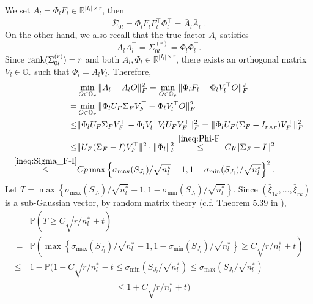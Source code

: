 \documentclass[11pt]{article}
\newcommand{\0}{{\mathbf{0}}}
\newcommand{\1}{{\mathbf{1}}}
\newcommand{\rank}{{\rm rank}}
\begin{document}
\begin{enumerate}[leftmargin=*]
	We set $\bar{A}_l = \Phi_l F_l \in \mathbb{R}^{|I_l|\times r}$, then
	$$\bar{\Sigma}_{0l} = \Phi_l F_lF_l^\top \Phi_l^\top =  \bar{A}_l\bar{A}_l^\top.$$
	On the other hand, we also recall that the true factor $A_l$ satisfies 
	\begin{equation}\label{eq:true-factor}
	A_lA_l^\top = \Sigma_{0l}^{(r)} = \Phi_l\Phi_l^\top.
	\end{equation}
	Since $\rank(\Sigma_{0l}^{(r)}) = r$ and both $A_l, \Phi_l\in \mathbb{R}^{|I_l|\times r}$, there exists an orthogonal matrix $V_l\in \mathbb{O}_r$ such that $\Phi_l = A_l V_l.$ Therefore,
	\begin{equation}\label{ineq:barA-A_l}
	\begin{split}
	& \min_{O\in \mathbb{O}_r} \|\bar{A}_l - A_lO\|_F^2 = \min_{O\in \mathbb{O}_r} \|\Phi_l F_l - \Phi_l V_l^\top O\|_F^2\\
	= & \min_{O\in \mathbb{O}_r} \|\Phi_l U_F\Sigma_F V_F^\top - \Phi_l V_l^\top O\|_F^2 \\
	\leq &  \|\Phi_l U_F\Sigma_FV_F^\top - \Phi_lV_l^\top V_lU_FV_F^\top \|_F ^2 = \|\Phi_lU_F(\Sigma_F - I_{r\times r})V_F^\top\|_F^2\\
	\leq & \|U_F(\Sigma_F - I)V_F^\top\|^2 \cdot \|\Phi_l\|_F^2 \overset{\eqref{ineq:Phi-F}}{\leq}  Cp\|\Sigma_F - I\|^2\\
	\overset{\eqref{ineq:Sigma_F-I}}{\leq} & Cp\max\left\{\sigma_{\max}(S_{J_l})/\sqrt{n_l^\ast} - 1, 1 - \sigma_{\min}(S_{J_l})/\sqrt{n_l^\ast}\right\}^2.
	\end{split}
	\end{equation}
	Let $T = \max\left\{\sigma_{\max}(S_{J_l})/\sqrt{n_l^\ast} - 1, 1 - \sigma_{\min}(S_{J_l})/\sqrt{n_l^\ast}\right\}$. Since $(\bar{\xi}_{1k}, \ldots, \bar{\xi}_{rk})$ is a sub-Gaussian vector, by random matrix theory (c.f. Theorem 5.39 in \cite{vershynin2010introduction}), 
	\begin{equation}\label{ineq:tail-bound-S}
	\begin{split}
	& \mathbb{P}\left(T\geq C\sqrt{r/n_l^\ast} + t\right)\\\
	= &  \mathbb{P}\left(\max\left\{\sigma_{\max}(S_{J_l})/\sqrt{n_l^\ast} - 1, 1 - \sigma_{\min}(S_{J_l})/\sqrt{n_l^\ast}\right\} \geq C\sqrt{r/n_l^\ast} + t\right)\\
	\leq & 1 - \mathbb{P}\Bigg(1 - C\sqrt{r/n_l^\ast} - t \leq \sigma_{\min}\left(S_{J_l}/\sqrt{n_l^\ast}\right)\leq \sigma_{\max}\left(S_{J_l}/\sqrt{n_l^\ast}\right) \\
	& \qquad \qquad \qquad \qquad \qquad \leq 1 + C\sqrt{r/n_l^\ast} + t\Bigg) \\

\end{split}
\end{equation}
\end{enumerate}
\end{document}
